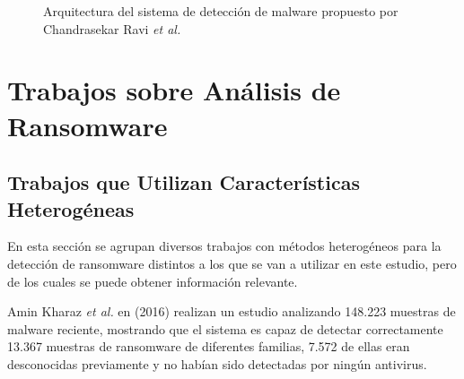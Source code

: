 \begin{figure}[h!]
\begin{center}
{}
\end{center}
\caption{Arquitectura del sistema de detección de malware propuesto por Chandrasekar Ravi \textit{et al.}}
\label{fig:ravi}
\end{figure}


\section{Trabajos sobre Análisis de Ransomware}
\label{sec:trabajosransom}
\subsection{Trabajos que Utilizan Características Heterogéneas}
\noindent En esta sección se agrupan diversos trabajos con métodos heterogéneos para la detección de ransomware distintos a los que se van a utilizar en este estudio, pero de los cuales se puede obtener información relevante.

Amin Kharaz \textit{et al.} en \cite{197235} (2016) realizan un estudio analizando 148.223 muestras de malware reciente, mostrando que el sistema es capaz de detectar correctamente 13.367 muestras de ransomware de diferentes familias, 7.572 de ellas eran desconocidas previamente y no habían sido detectadas por ningún antivirus. 

